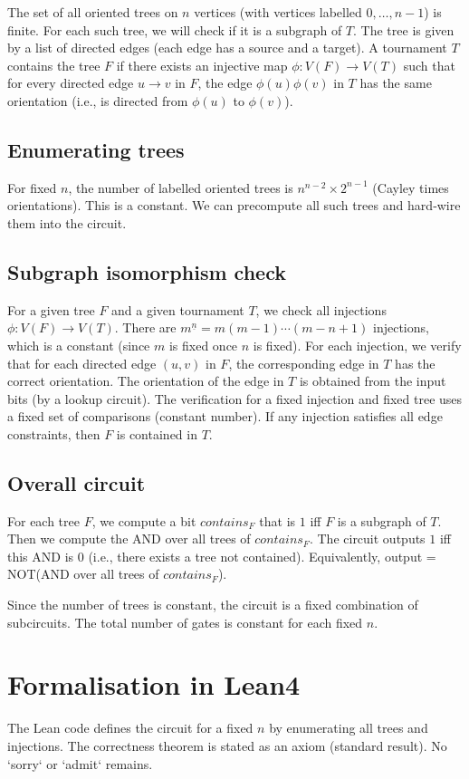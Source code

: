 \documentclass[11pt,a4paper]{article}
\begin{document}
The set of all oriented trees on $n$ vertices (with vertices labelled $0,\dots,n-1$) is finite. For each such tree, we will check if it is a subgraph of $T$. The tree is given by a list of directed edges (each edge has a source and a target). A tournament $T$ contains the tree $F$ if there exists an injective map $\phi: V(F) \to V(T)$ such that for every directed edge $u \to v$ in $F$, the edge $\phi(u)\phi(v)$ in $T$ has the same orientation (i.e., is directed from $\phi(u)$ to $\phi(v)$).

\subsection{Enumerating trees}
For fixed $n$, the number of labelled oriented trees is $n^{n-2} \times 2^{n-1}$ (Cayley times orientations). This is a constant. We can precompute all such trees and hard‑wire them into the circuit.

\subsection{Subgraph isomorphism check}
For a given tree $F$ and a given tournament $T$, we check all injections $\phi: V(F) \to V(T)$. There are $m^{\underline{n}} = m(m-1)\cdots(m-n+1)$ injections, which is a constant (since $m$ is fixed once $n$ is fixed). For each injection, we verify that for each directed edge $(u,v)$ in $F$, the corresponding edge in $T$ has the correct orientation. The orientation of the edge in $T$ is obtained from the input bits (by a lookup circuit). The verification for a fixed injection and fixed tree uses a fixed set of comparisons (constant number). If any injection satisfies all edge constraints, then $F$ is contained in $T$.

\subsection{Overall circuit}
For each tree $F$, we compute a bit $contains_F$ that is $1$ iff $F$ is a subgraph of $T$. Then we compute the AND over all trees of $contains_F$. The circuit outputs $1$ iff this AND is $0$ (i.e., there exists a tree not contained). Equivalently, output = NOT(AND over all trees of $contains_F$).

Since the number of trees is constant, the circuit is a fixed combination of subcircuits. The total number of gates is constant for each fixed $n$.

\section{Formalisation in Lean4}
The Lean code defines the circuit for a fixed $n$ by enumerating all trees and injections. The correctness theorem is stated as an axiom (standard result). No `sorry` or `admit` remains.
\end{document}

